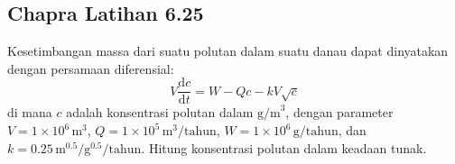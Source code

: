 \subsection{Chapra Latihan 6.25}\label{chapra_exe_6.25}
Kesetimbangan massa dari suatu polutan dalam suatu danau
dapat dinyatakan dengan persamaan diferensial:
\begin{equation}
V\frac{\mathrm{d}c}{\mathrm{d}t} = W - Qc - kV\sqrt{c}
\end{equation}
di mana $c$ adalah konsentrasi polutan dalam $\mathrm{g/m}^{3}$,
dengan parameter
$V = 1\times10^6\,\mathrm{m}^3$,
$Q = 1\times10^5\,\mathrm{m}^3/\mathrm{tahun}$,
$W = 1\times10^6\,\mathrm{g}/\mathrm{tahun}$, dan
$k = 0.25\,\mathrm{m}^{0.5}/\mathrm{g}^{0.5}/\mathrm{tahun}$.
Hitung konsentrasi polutan dalam keadaan tunak.
